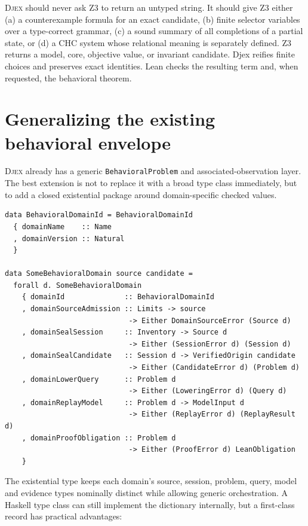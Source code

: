 \documentclass[11pt,oneside]{report}
\newcommand{\Djex}{\textsc{Djex}\xspace}
\newcommand{\code}[1]{\texttt{#1}}
\begin{document}
\Djex should never ask Z3 to return an untyped string. It should give Z3 either (a) a counterexample formula for an exact candidate, (b) finite selector variables over a type-correct grammar, (c) a sound summary of all completions of a partial state, or (d) a CHC system whose relational meaning is separately defined. Z3 returns a model, core, objective value, or invariant candidate. Djex reifies finite choices and preserves exact identities. Lean checks the resulting term and, when requested, the behavioral theorem.

\section{Generalizing the existing behavioral envelope}

\Djex already has a generic \code{BehavioralProblem} and associated-observation layer. The best extension is not to replace it with a broad type class immediately, but to add a closed existential package around domain-specific checked values.

\begin{lstlisting}[language=HaskellX,caption={Sketch of a first-class behavioral-domain package.},label={lst:domain-package}]
data BehavioralDomainId = BehavioralDomainId
  { domainName    :: Name
  , domainVersion :: Natural
  }

data SomeBehavioralDomain source candidate =
  forall d. SomeBehavioralDomain
    { domainId              :: BehavioralDomainId
    , domainSourceAdmission :: Limits -> source
                             -> Either DomainSourceError (Source d)
    , domainSealSession     :: Inventory -> Source d
                             -> Either (SessionError d) (Session d)
    , domainSealCandidate   :: Session d -> VerifiedOrigin candidate
                             -> Either (CandidateError d) (Problem d)
    , domainLowerQuery      :: Problem d
                             -> Either (LoweringError d) (Query d)
    , domainReplayModel     :: Problem d -> ModelInput d
                             -> Either (ReplayError d) (ReplayResult d)
    , domainProofObligation :: Problem d
                             -> Either (ProofError d) LeanObligation
    }
\end{lstlisting}

The existential type keeps each domain's source, session, problem, query, model and evidence types nominally distinct while allowing generic orchestration. A Haskell type class can still implement the dictionary internally, but a first-class record has practical advantages:
\end{document}
